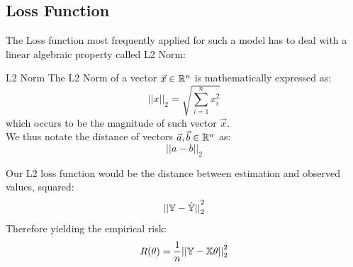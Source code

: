 \subsection{Loss Function}
The Loss function most frequently applied for such a model has to deal with a linear algebraic property called L2 Norm:
\begin{ln-define}{L2 Norm}{}
    The L2 Norm of a vector $\vec{x} \in \mathbb{R}^n$ is mathematically expressed as:
    \[{||x||}_2 = \sqrt{\sum_{i = 1}^n x_i^2}\]
    which occurs to be the magnitude of such vector $\vec{x}$. \\
    We thus notate the distance of vectors $\vec{a}, \vec{b} \in \mathbb{R}^n$ as:
    \[{||a - b||}_2\]
\end{ln-define}
Our L2 loss function would be the distance between estimation and observed values, squared:
\[{||\mathbb{Y} - \hat{\mathbb{Y}}||}_2^2\]
Therefore yielding the empirical risk:
\[R(\theta) = \frac{1}{n} {||\mathbb{Y} - \mathbb{X} \theta||}_2^2\]

